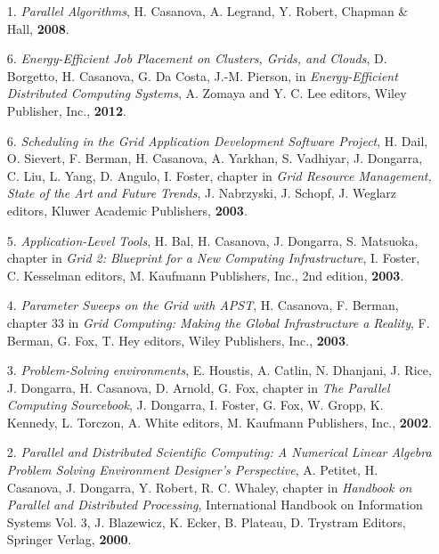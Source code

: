
\begin{itemize}
\item [1.] {\it Parallel Algorithms}, H. Casanova, A. Legrand, Y. Robert, Chapman \& Hall, {\bf 2008}.

\end{itemize}


\begin{itemize}

\item [6.] 
{\it Energy-Efficient Job Placement on Clusters, Grids, and Clouds},
D. Borgetto, H. Casanova, G. Da Costa, J.-M. Pierson,
in {\it Energy-Efficient Distributed Computing Systems},
A. Zomaya and Y. C. Lee editors, Wiley Publisher, Inc., {\bf 2012}.

\item [6.] 
{\it Scheduling in the Grid Application Development Software Project},
H. Dail, O. Sievert, F. Berman, H. Casanova, A. Yarkhan, S. Vadhiyar,
J. Dongarra, C. Liu, L. Yang, D. Angulo, I. Foster, chapter in {\it Grid
Resource Management, State of the Art and Future Trends}, J. Nabrzyski,
J. Schopf, J. Weglarz editors, Kluwer Academic Publishers, {\bf 2003}.


\item [5.] 
{\it Application-Level Tools}, H. Bal, H. Casanova, J. Dongarra,
S. Matsuoka, chapter in {\it Grid 2: Blueprint for a New
Computing Infrastructure}, I. Foster, C. Kesselman editors, M. Kaufmann
Publishers, Inc., 2nd edition, {\bf 2003}.

\item[4.]
{\it Parameter Sweeps on the Grid with APST}, H. Casanova, F. Berman,
chapter 33 in {\it Grid Computing: Making the Global Infrastructure a
Reality}, F. Berman, G. Fox, T. Hey editors, Wiley Publishers, Inc.,
{\bf 2003}.

\item[3.]
{\it Problem-Solving environments}, E. Houstis, A. Catlin, N. Dhanjani,
J. Rice, J. Dongarra, H. Casanova, D. Arnold, G. Fox, chapter in {\it The
Parallel Computing Sourcebook}, J. Dongarra, I. Foster, G. Fox, W. Gropp,
K. Kennedy, L. Torczon, A. White editors, M. Kaufmann Publishers, Inc.,
{\bf 2002}.

\item[2.]
{\it Parallel and Distributed Scientific Computing: A Numerical
Linear Algebra Problem Solving Environment Designer's Perspective}, A.
Petitet, H. Casanova, J. Dongarra, Y. Robert, R. C. Whaley, chapter in
\emph{Handbook on Parallel and Distributed Processing}, International
Handbook on Information Systems Vol. 3, J. Blazewicz, K. Ecker,
B. Plateau, D. Trystram Editors, Springer Verlag, {\bf 2000}.


\end{itemize}
